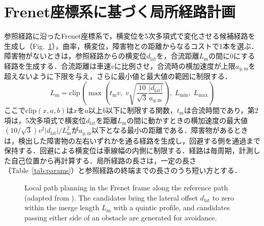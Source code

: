 \section{Frenet座標系に基づく局所経路計画}
\label{sec:local_planner}
参照経路に沿ったFrenet座標系\cite{werling2010}で，横変位を5次多項式で変化させる候補経路を生成し（Fig.~\ref{fig:frenet}），曲率，横変位，障害物との距離からなるコストで1本を選ぶ．障害物がないときは，参照経路からの横変位$d_{\mathrm{lat}}$を，合流距離$L_{\mathrm{m}}$の間に0にする経路を生成する．合流距離は車速$v$に比例させ，合流時の横加速度が上限$a_{y,\mathrm{m}}$を超えないように下限を与え，さらに最小値と最大値の範囲に制限する．
\begin{equation}
  L_{\mathrm{m}} = \mathrm{clip}\left(\max\left(t_{\mathrm{m}} v,\; v\sqrt{\frac{10}{\sqrt{3}}\frac{|d_{\mathrm{lat}}|}{a_{y,\mathrm{m}}}}\right),\; L_{\min},\; L_{\max}\right)
  \label{eq:merge}
\end{equation}
ここで$\mathrm{clip}(x,a,b)$は$x$を$a$以上$b$以下に制限する関数，$t_{\mathrm{m}}$は合流時間であり，第2項は，5次多項式で横変位$d_{\mathrm{lat}}$を距離$L_{\mathrm{m}}$の間に動かすときの横加速度の最大値$(10/\sqrt{3})v^2|d_{\mathrm{lat}}|/L_{\mathrm{m}}^2$が$a_{y,\mathrm{m}}$以下となる最小の距離である．障害物があるときは，検出した障害物の左右いずれかを通る経路を生成し，回避する側を通過まで保持する．回避による横変位は車線幅の内側に制限する．経路は毎周期，計測した自己位置から再計算する．局所経路の長さは，一定の長さ（Table~\ref{tab:params}）と参照経路の終端までの長さのうち短い方とする．

\begin{figure}[H]
  \centering
  
  \caption[Local path planning in the Frenet frame.]{Local path planning in the Frenet frame along the reference path (adapted from \cite{werling2010}). The candidates bring the lateral offset $d_{\mathrm{lat}}$ to zero within the merge length $L_{\mathrm{m}}$ with a quintic profile, and candidates passing either side of an obstacle are generated for avoidance.}
  \label{fig:frenet}
\end{figure}

